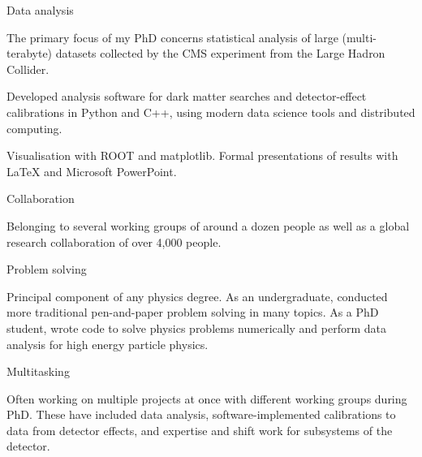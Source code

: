 
\newcommand{\vpaddingskills}{\vspace{1mm}}

\begin{cventries}

    \cventry
    {} %
    {Data analysis} %
    {} %
    {} %
    {
      \begin{cvitems}
        \item {The primary focus of my PhD concerns statistical analysis of large (multi-terabyte) datasets collected by the CMS experiment from the Large Hadron Collider.}
        \item {Developed analysis software for dark matter searches and detector-effect calibrations in Python and C++, using modern data science tools and distributed computing.}
        \item{Visualisation with ROOT and matplotlib. Formal presentations of results with LaTeX and Microsoft PowerPoint.}
        \vpaddingskills
        \end{cvitems}
    }

    \cventry
    {}
    {Collaboration}
    {}
    {}
    {
      \begin{cvitems}
        \item {Belonging to several working groups of around a dozen people as well as a global research collaboration of over 4,000 people.}
        \vpaddingskills
        \end{cvitems}
    }

    \cventry
    {}
    {Problem solving}
    {}
    {}
    {
      \begin{cvitems}
        \item {Principal component of any physics degree. As an undergraduate, conducted more traditional pen-and-paper problem solving in many topics. As a PhD student, wrote code to solve physics problems numerically and perform data analysis for high energy particle physics.}
        \vpaddingskills
        \end{cvitems}
    }

    \cventry
    {}
    {Multitasking}
    {}
    {}
    {
      \begin{cvitems}
        \item {Often working on multiple projects at once with different working groups during PhD. These have included data analysis, software-implemented calibrations to data from detector effects, and expertise and shift work for subsystems of the detector.}
        \vpaddingskills
        \end{cvitems}
    }


\end{cventries}
